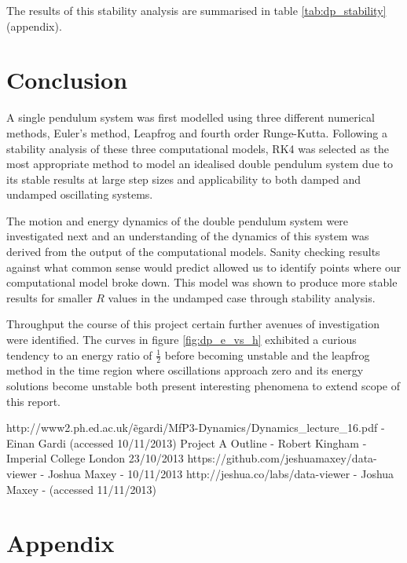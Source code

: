 \documentclass[11pt]{article}
\begin{document}
The results of this stability analysis are summarised in table \ref{tab:dp_stability} (appendix).

\section{Conclusion}
A single pendulum system was first modelled using three different numerical methods, Euler's method, Leapfrog and fourth order Runge-Kutta. Following a stability analysis of these three computational models, RK4 was selected as the most appropriate method to model an idealised double pendulum system due to its stable results at large step sizes and applicability to both damped and undamped oscillating systems.

The motion and energy dynamics of the double pendulum system were investigated next and an understanding of the dynamics of this system was derived from the output of the computational models. Sanity checking results against what common sense would predict allowed us to identify points where our computational model broke down. This model was shown to produce more stable results for smaller $R$ values in the undamped case through stability analysis.

Throughput the course of this project certain further avenues of investigation were identified. The curves in figure \ref{fig:dp_e_vs_h} exhibited a curious tendency to an energy ratio of $\frac{1}{2}$ before becoming unstable and the leapfrog method in the time region where oscillations approach zero and its energy solutions become unstable both present interesting phenomena to extend scope of this report.

\begin{thebibliography}{10}
 http://www2.ph.ed.ac.uk/\~egardi/MfP3-Dynamics/Dynamics\_lecture\_16.pdf - Einan Gardi (accessed 10/11/2013)
 Project A Outline - Robert Kingham - Imperial College London 23/10/2013
 https://github.com/jeshuamaxey/data-viewer - Joshua Maxey - 10/11/2013
 http://jeshua.co/labs/data-viewer - Joshua Maxey - (accessed 11/11/2013)
\end{thebibliography}

\newpage
\section{Appendix} \label{app:Appendix}
\end{document}
